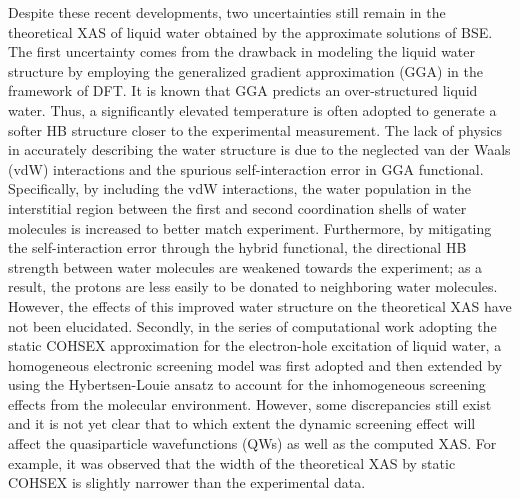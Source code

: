 \documentclass[prb,twocolumn,showpacs,preprintnumbers,superscriptaddress,amsmath,amssymb]{revtex4}
\begin{document}
Despite these recent developments, two uncertainties still remain
in the theoretical XAS of liquid water obtained by the approximate solutions of BSE.
The first uncertainty comes from the drawback in modeling the liquid water structure by
employing the generalized gradient approximation (GGA) in the framework of 
DFT.\cite{asthagiri2003free,grossman2004towards,schwegler2004towards,vandevondele2005influence,yoo2011communication,mogelhoj2011ab,wang2011density,yoo2009phase,zhang2011first,zhang2011structural,distasio2014individual}
It is known that GGA predicts an over-structured liquid water.\cite{yoo2009phase,zhang2011first,zhang2011structural,distasio2014individual}
Thus, a significantly elevated temperature is often
adopted to generate a softer HB structure closer to
the experimental measurement.\cite{zhang2011first,zhang2011structural,distasio2014individual}
The lack of physics in accurately describing the water structure
is due to the neglected van der Waals (vdW) interactions and
the spurious self-interaction error\cite{perdew1981self} in GGA functional.
Specifically, by including the vdW interactions, the water population
in the interstitial region between the first and second coordination shells of water molecules
is increased to better match experiment.\cite{distasio2014individual}
Furthermore, by mitigating the self-interaction error through the hybrid functional,
the directional HB strength between water molecules are weakened towards the experiment;
as a result, the protons are less easily to be donated to neighboring water molecules.\cite{distasio2014individual}
%
However, the effects of this improved water structure on the theoretical XAS have not been elucidated.
Secondly, in the series of computational work adopting the static COHSEX approximation for
the electron-hole excitation of liquid water, a homogeneous electronic screening model was first adopted\cite{chen2010PRLxas}
and then extended by using the Hybertsen-Louie ansatz\cite{88B-Mark} to
account for the inhomogeneous screening effects from the molecular environment.\cite{kong2012PRB}
However, some discrepancies still exist and it is not yet clear that to which extent the dynamic screening effect will affect the quasiparticle wavefunctions (QWs)
as well as the computed XAS.
For example, it was observed that the width of the theoretical XAS by static COHSEX is slightly narrower than
the experimental data.\cite{kong2012PRB}
\end{document}

